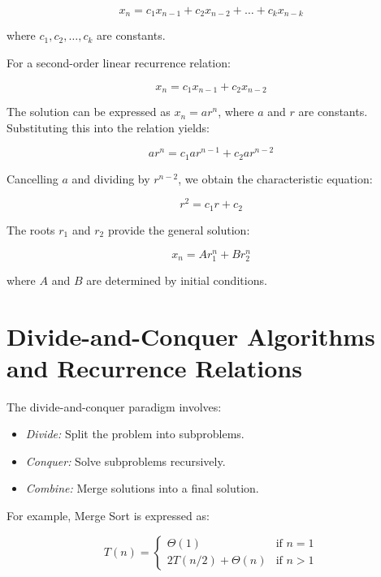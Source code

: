 \documentclass{article}
\begin{document}
    \begin{equation}
        x_n = c_1x_{n-1} + c_2x_{n-2} + \ldots + c_kx_{n-k}
    \end{equation}

    where $c_1, c_2, \ldots, c_k$ are constants.

    For a second-order linear recurrence relation:

    \begin{equation}
        x_n = c_1x_{n-1} + c_2x_{n-2}
    \end{equation}

    The solution can be expressed as $x_n = ar^n$, where $a$ and $r$ are constants. Substituting this into the relation yields:

    \begin{equation}
        ar^n = c_1ar^{n-1} + c_2ar^{n-2}
    \end{equation}

    Cancelling $a$ and dividing by $r^{n-2}$, we obtain the characteristic equation:

    \begin{equation}
        r^2 = c_1r + c_2
    \end{equation}

    The roots $r_1$ and $r_2$ provide the general solution:

    \begin{equation}
        x_n = A r_1^n + B r_2^n
    \end{equation}

    where $A$ and $B$ are determined by initial conditions.

    \section{Divide-and-Conquer Algorithms and Recurrence Relations}
    The divide-and-conquer paradigm involves:

    \begin{itemize}
        \item \textit{Divide:} Split the problem into subproblems.
        \item \textit{Conquer:} Solve subproblems recursively.
        \item \textit{Combine:} Merge solutions into a final solution.
    \end{itemize}

    For example, Merge Sort is expressed as:

    \begin{equation}
        T(n) =
        \begin{cases}
            \Theta(1) & \text{if } n = 1 \\
            2T(n/2) + \Theta(n) & \text{if } n > 1
        \end{cases}
    \end{equation}
\end{document}
